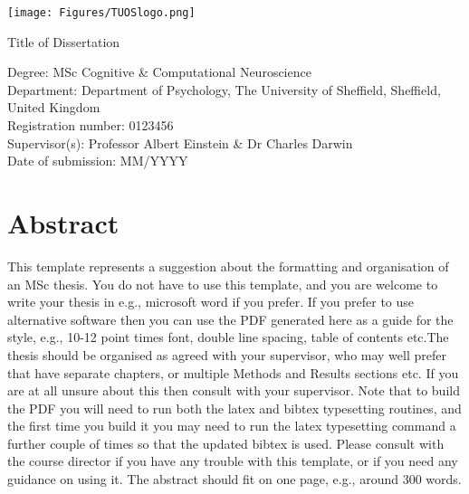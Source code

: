 \documentclass[a4paper,11pt]{article}
\date{}
\begin{document}
\texttt{[image: Figures/TUOSlogo.png]}
\vspace{10em}
\begin{center}
{\huge
Title of Dissertation \vspace{6em}
}
\end{center}
\begin{flushleft}
Degree: MSc Cognitive \& Computational Neuroscience \vspace{1em}\\
Department: Department of Psychology, The University of Sheffield, Sheffield, United Kingdom\vspace{1em}\\
Registration number: 0123456\vspace{1em}\\
Supervisor(s): Professor Albert Einstein \& Dr Charles Darwin \vspace{1em}\\
Date of submission: MM/YYYY\vspace{5em}\\
\end{flushleft}
\newpage{}

\section*{Abstract}
 
This template represents a suggestion about the formatting and organisation of an MSc thesis. You do not have to use this template, and you are welcome to write your thesis in e.g., microsoft word if you prefer. If you prefer to use alternative software then you can use the PDF generated here as a guide for the style, e.g., 10-12 point times font, double line spacing, table of contents etc.The thesis should be organised as agreed with your supervisor, who may well prefer that have separate chapters, or multiple Methods and Results sections etc. If you are at all unsure about this then consult with your supervisor. Note that to build the PDF you will need to run both the latex and bibtex typesetting routines, and the first time you build it you may need to run the latex typesetting command a further couple of times so that the updated bibtex is used. Please consult with the course director if you have any trouble with this template, or if you need any guidance on using it. The abstract should fit on one page, e.g., around 300 words.
 
\newpage{}
\end{document}
